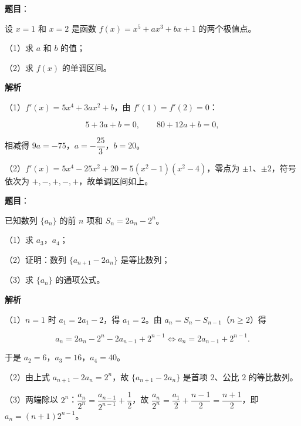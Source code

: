 \begin{answer}

\textbf{题目}：

设 $x=1$ 和 $x=2$ 是函数 $f(x)=x^5+ax^3+bx+1$ 的两个极值点。

（1）求 $a$ 和 $b$ 的值；

（2）求 $f(x)$ 的单调区间。

\textbf{解析}

（1）$f'(x)=5x^4+3ax^2+b$，由 $f'(1)=f'(2)=0$：

\nopagebreak[4]
\[5+3a+b=0,\qquad 80+12a+b=0,\]

相减得 $9a=-75$，$a=-\dfrac{25}3$，$b=20$。

（2）$f'(x)=5x^4-25x^2+20=5(x^2-1)(x^2-4)$，零点为 $\pm1$、$\pm2$，符号依次为 $+,-,+,-,+$，故单调区间如上。


\end{answer}
\begin{answer}

\textbf{题目}：

已知数列 $\{a_n\}$ 的前 $n$ 项和 $S_n=2a_n-2^n$。

（1）求 $a_3$，$a_4$；

（2）证明：数列 $\{a_{n+1}-2a_n\}$ 是等比数列；

（3）求 $\{a_n\}$ 的通项公式。

\textbf{解析}

（1）$n=1$ 时 $a_1=2a_1-2$，得 $a_1=2$。由 $a_n=S_n-S_{n-1}$（$n\geqslant2$）得

\nopagebreak[4]
\[a_n=2a_n-2^n-2a_{n-1}+2^{n-1}\iff a_n=2a_{n-1}+2^{n-1}.\]

于是 $a_2=6$，$a_3=16$，$a_4=40$。

（2）由上式 $a_{n+1}-2a_n=2^n$，故 $\{a_{n+1}-2a_n\}$ 是首项 $2$、公比 $2$ 的等比数列。

（3）两端除以 $2^n$：$\dfrac{a_n}{2^n}=\dfrac{a_{n-1}}{2^{n-1}}+\dfrac12$，故 $\dfrac{a_n}{2^n}=\dfrac{a_1}2+\dfrac{n-1}2=\dfrac{n+1}2$，即 $a_n=(n+1)2^{n-1}$。


\end{answer}
